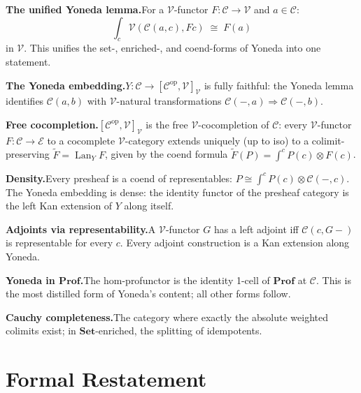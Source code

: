 \begin{summarybox}
\textbf{The unified Yoneda lemma.}\quad For a $\mathcal{V}$-functor $F :
\mathcal{C} \to \mathcal{V}$ and $a \in \mathcal{C}$:
\[
  \int_c \mathcal{V}(\mathcal{C}(a, c), F c) \;\cong\; F(a)
\]
in $\mathcal{V}$. This unifies the set-, enriched-, and coend-forms of
Yoneda into one statement.

\textbf{The Yoneda embedding.}\quad $Y : \mathcal{C} \to [\mathcal{C}^{\mathrm{op}},
\mathcal{V}]_\mathcal{V}$ is fully faithful: the Yoneda lemma identifies
$\mathcal{C}(a, b)$ with $\mathcal{V}$-natural transformations
$\mathcal{C}(-, a) \Rightarrow \mathcal{C}(-, b)$.

\textbf{Free cocompletion.}\quad $[\mathcal{C}^{\mathrm{op}}, \mathcal{V}]_\mathcal{V}$
is the free $\mathcal{V}$-cocompletion of $\mathcal{C}$: every
$\mathcal{V}$-functor $F : \mathcal{C} \to \mathcal{E}$ to a cocomplete
$\mathcal{V}$-category extends uniquely (up to iso) to a colimit-preserving
$\widetilde F = \operatorname{Lan}_Y F$, given by the coend formula
$\widetilde F(P) = \int^c P(c) \otimes F(c)$.

\textbf{Density.}\quad Every presheaf is a coend of representables: $P \cong
\int^c P(c) \otimes \mathcal{C}(-, c)$. The Yoneda embedding is dense: the
identity functor of the presheaf category is the left Kan extension of $Y$
along itself.

\textbf{Adjoints via representability.}\quad A $\mathcal{V}$-functor $G$ has
a left adjoint iff $\mathcal{C}(c, G-)$ is representable for every $c$. Every
adjoint construction is a Kan extension along Yoneda.

\textbf{Yoneda in $\mathbf{Prof}$.}\quad The hom-profunctor is the identity
1-cell of $\mathbf{Prof}$ at $\mathcal{C}$. This is the most distilled form
of Yoneda's content; all other forms follow.

\textbf{Cauchy completeness.}\quad The category where exactly the absolute
weighted colimits exist; in $\mathbf{Set}$-enriched, the splitting of
idempotents.
\end{summarybox}


\section*{Formal Restatement}

